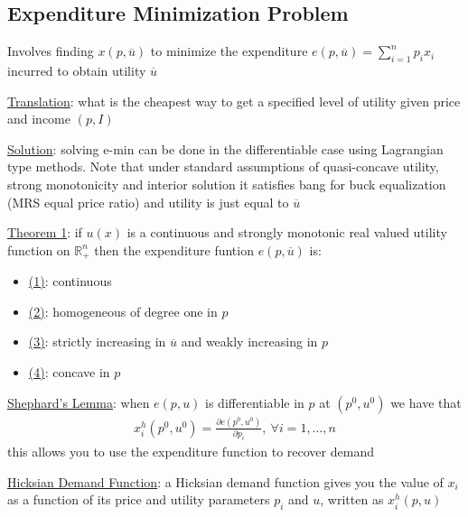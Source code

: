 \documentclass{article}
\begin{document}
\subsection{Expenditure Minimization Problem}
Involves finding $x(p, \overline{u})$ to minimize the expenditure $e(p,\overline{u}) = \sum_{i=1}^{n}p_{i}x_{i}$ incurred to obtain utility $\overline{u}$ \par \vspace{0.3em}
\vspace{6mm}
  \underline{Translation}: what is the cheapest way to get a specified level of utility given price and income $(p, I)$
  \par
  \underline{Solution}: solving e-min can be done in the differentiable case using Lagrangian type methods. Note that under standard assumptions of quasi-concave utility, strong monotonicity and interior solution it satisfies bang for buck equalization (MRS equal price ratio) and utility is just equal to $\overline{u}$
  \par
  \underline{Theorem 1}: if $u(x)$ is a continuous and strongly monotonic real valued utility function on $\mathbb{R}_{+}^{n}$ then the expenditure funtion $e(p, \overline{u})$ is:
  \begin{itemize}
    \item  \underline{(1)}: continuous
    \item  \underline{(2)}: homogeneous of degree one in $p$
    \item  \underline{(3)}: strictly increasing in $\overline{u}$ and weakly increasing in $p$
    \item  \underline{(4)}: concave in $p$
  \end{itemize}
  \par
  \underline{Shephard's Lemma}: when $e(p,u)$ is differentiable in $p$ at $(p^{0}, u^{0})$ we have that
  \begin{gather*}
    x_{i}^{h}(p^{0},u^{0}) = \frac{\partial e(p^{0},u^{0})}{\partial p_{i}}, \ \forall i = 1, \dots, n
  \end{gather*}
  this allows you to use the expenditure function to recover demand
  \par
  \underline{Hicksian Demand Function}: a Hicksian demand function gives you the value of $x_{i}$ as a function of its price and utility parameters $p_{i}$ and $u$, written as $x_{i}^{h}(p,u)$
\end{document}
